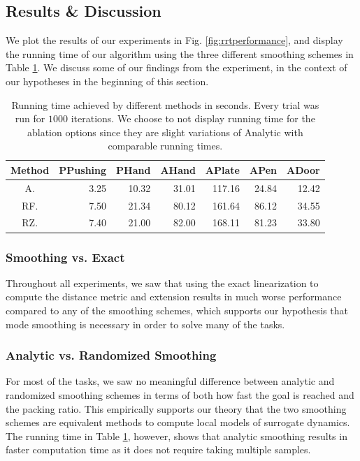 \subsection{Results \& Discussion}

We plot the results of our experiments in Fig. \ref{fig:rrtperformance}, and display the running time of our algorithm using the three different smoothing schemes in Table \ref{table:rrtrresults}. We discuss some of our findings from the experiment, in the context of our hypotheses in the beginning of this section.

\begin{table}[thpb]
\centering
\begin{tabular}{|| c | r | r | r | r | r | r || } 
 \hline
 Method & PPushing & PHand & AHand & APlate & APen & ADoor
 \\\hline
    A. & 3.25  & 10.32 & 31.01 & 117.16 & 24.84 & 12.42  \\
    RF.  & 7.50 & 21.34 & 80.12 & 161.64 & 86.12 & 34.55\\
    RZ. & 7.40 & 21.00 & 82.00 & 168.11 & 81.23 & 33.80 \\\hline
\end{tabular}
\caption{Running time achieved by different methods in seconds. Every trial was run for $1000$ iterations. We choose to not display running time for the ablation options since they are slight variations of Analytic with comparable running times.}
\label{table:rrtrresults}
\end{table}

\subsubsection{Smoothing vs. Exact} Throughout all experiments, we saw that using the exact linearization to compute the distance metric and extension results in much worse performance compared to any of the smoothing schemes, which supports our hypothesis that mode smoothing is necessary in order to solve many of the tasks.

\subsubsection{Analytic vs. Randomized Smoothing} For most of the tasks, we saw no meaningful difference between analytic and randomized smoothing schemes in terms of both how fast the goal is reached and the packing ratio. This empirically supports our theory that the two smoothing schemes are equivalent methods to compute local models of surrogate dynamics. The running time in Table \ref{table:rrtrresults}, however, shows that analytic smoothing results in faster computation time as it does not require taking multiple samples. 

